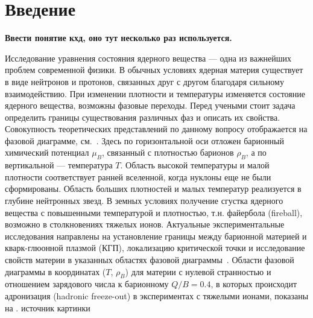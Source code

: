 \chapter*{Введение}\label{sec:secIntro}

\todo
\textbf{Ввести понятие кхд, оно тут несколько раз используется.}


Исследование уравнения состояния ядерного вещества --- одна из важнейших проблем современной физики. В обычных условиях ядерная материя существует в виде нейтронов и протонов, связанных друг с другом благодаря сильному взаимодействию. При изменении плотности и температуры изменяется состояние ядерного вещества, возможны фазовые переходы. Перед учеными стоит задача определить границы существования различных фаз и описать их свойства. Совокупность теоретических представлений по данному вопросу отображается на фазовой диаграмме, см.~. Здесь по горизонтальной оси отложен барионный химический потенциал $\mu_{B}$, связанный с плотностью барионов $\rho_{B}$, а по вертикальной --- температура $T$. Область высокой температуры и малой плотности соответствует ранней вселенной, когда нуклоны еще не были сформированы. Область больших плотностей и малых температур реализуется в глубине нейтронных звезд. В земных условиях получение сгустка ядерного вещества с повышенными температурой и плотностью, т.н. файербола (fireball), возможно в столкновениях тяжелых ионов. Актуальные экспериментальные исследования направлены на установление границы между барионной материей и кварк-глюонной плазмой (КГП), локализацию критической точки и исследование свойств материи в указанных областях фазовой диаграммы~\cite{CBMBook}. Области фазовой диаграммы в координатах ($T$, $\rho_{B}$) для материи с нулевой странностью и отношением зарядового числа к барионному $Q/B=0.4$, в которых происходит адронизация (hadronic freeze-out) в экспериментах с тяжелыми ионами, показаны на . \cite{} \todo источник картинки

